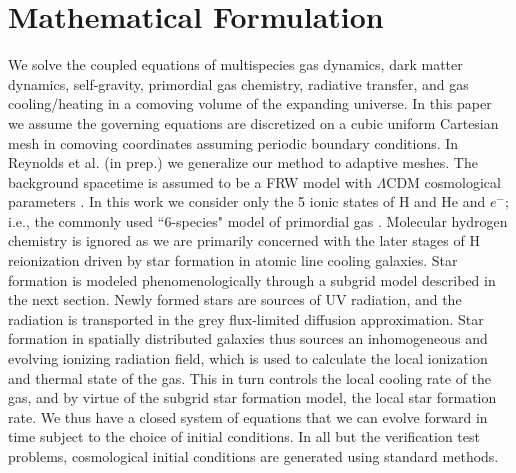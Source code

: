 
\section{Mathematical Formulation}
\label{sec:math_formulation}



We solve the coupled equations of multispecies gas dynamics, dark matter dynamics, self-gravity, 
primordial gas chemistry, radiative transfer, and gas cooling/heating in a comoving volume
of the expanding universe. In this paper we assume the governing equations are discretized on a cubic uniform Cartesian mesh  in comoving 
coordinates assuming periodic boundary conditions. In Reynolds et
al. (in prep.) we generalize our method to adaptive meshes. 
The background spacetime is assumed to be a FRW model with $\Lambda$CDM cosmological parameters \citep{WMAP7}. In this work we consider only the 5 ionic states of H and He and $e^-$; i.e., the commonly used ``6-species" model of primordial gas \citep{AbelEtAl1997, Anninos97}. Molecular hydrogen chemistry is ignored as we are primarily concerned with the later stages of H reionization driven by star formation in atomic line cooling galaxies. Star formation is modeled phenomenologically through a subgrid model described in the next section. Newly formed stars are sources of UV radiation, and the radiation is transported in the grey flux-limited diffusion approximation. Star formation in spatially distributed galaxies thus sources an inhomogeneous and evolving ionizing radiation field, which is used to calculate the local ionization and thermal state of the gas. This in turn controls the local cooling rate of the gas, and by virtue of the subgrid star formation model, the local star formation rate. We thus have a closed system of equations that we can evolve forward in time subject to the choice of initial conditions. In all but the verification test problems, cosmological initial conditions are generated using standard methods.  

